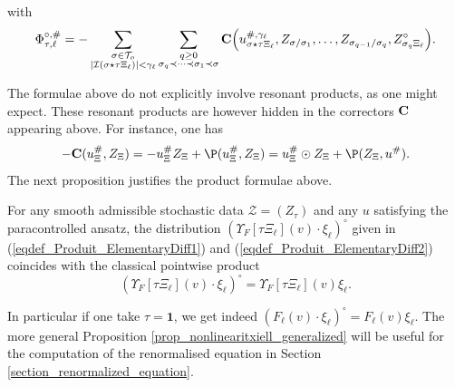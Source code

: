 \documentclass[11pt]{preprint}
\newcommand{\mcI}{\mathcal{I}}
\newcommand{\mcZ}{\mathcal{Z}}
\newcommand{\mcT}{\mathcal{T}}
\def\eqref#1{(\ref{#1})}
\newcommand{\bfC}{{\bf C}}
\begin{document}
		with
		\begin{equation}\label{eqdef_Produit_ElementaryDiff2}
			\Phi_{\tau,\ell}^{\circ,\#} = - \sum_{\substack{\sigma\in\mcT_o \\ |\mcI(\sigma \star \tau\Xi_\ell)|<\gamma_\ell    }} \sum_{\substack{q\geq0 \\ \sigma_q\prec\dots\prec\sigma_1\prec\sigma }} {\bf C} \Big(u^{\#,\gamma_\ell}_{\sigma \star \tau\Xi_\ell},Z_{\sigma/\sigma_1}, \dots,Z_{\sigma_{q-1}/\sigma_q}, Z^{\circ}_{\sigma_q\Xi_\ell}\Big) .
		\end{equation}
		
	The formulae above do not explicitly involve resonant products, as one might expect. These resonant products are however hidden in the correctors $\bfC$ appearing above. For instance, one has $$-\bfC(u_\Xi^\#,Z_\Xi) = -u_\Xi^\# Z_\Xi + \P(u^\#_\Xi,Z_\Xi) =  u_\Xi^\# \odot Z_\Xi +  \P(Z_\Xi,u^\#).$$
		The next proposition justifies the product formulae above.
			\begin{proposition}\label{prop_nonlinearitxiell_generalized}
		For any smooth admissible stochastic data $\mcZ=(Z_\tau)$  and any $u$ satisfying the paracontrolled ansatz, the distribution $(\Upsilon_F[\tau\Xi_\ell](v)\cdot\xi_\ell)^\circ$ given in \eqref{eqdef_Produit_ElementaryDiff1} and \eqref{eqdef_Produit_ElementaryDiff2} coincides with the classical pointwise product $$(\Upsilon_F[\tau\Xi_\ell](v)\cdot\xi_\ell)^\circ = \Upsilon_F[\tau\Xi_\ell](v)\xi_\ell.$$
	\end{proposition}
	In particular if one take $\tau=\mathbf{1}$, we get indeed
	$
	\left(F_\ell(v)\cdot\xi_\ell\right)^\circ = F_\ell(v)\xi_\ell.
	$
	The more general Proposition \ref{prop_nonlinearitxiell_generalized} will be useful for the computation of the renormalised equation in Section \ref{section_renormalized_equation}.
\end{document}
